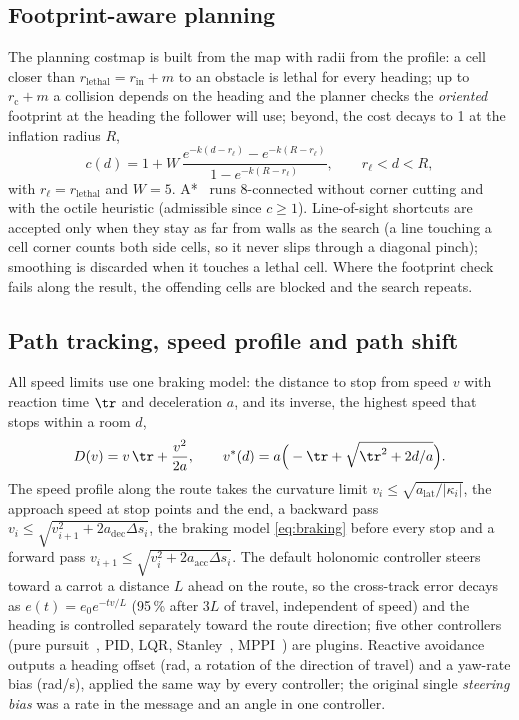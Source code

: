 \subsection{Footprint-aware planning}
\label{sec:plan}

The planning costmap is built from the map with radii from the profile: a cell closer than
$r_{\mathrm{lethal}} = r_{\mathrm{in}} + m$ to an obstacle is lethal for every heading; up to
$r_{\mathrm{c}} + m$ a collision depends on the heading and the planner checks the
\emph{oriented} footprint at the heading the follower will use; beyond, the cost decays to 1 at
the inflation radius $R$,
\begin{equation}
  c(d) = 1 + W\, \frac{e^{-k(d - r_{\ell})} - e^{-k(R - r_{\ell})}}
  {1 - e^{-k(R - r_{\ell})}}, \qquad r_{\ell} < d < R,
\end{equation}
with $r_\ell = r_{\mathrm{lethal}}$ and $W = 5$. A*~\cite{hart1968astar} runs 8-connected without corner cutting and with the
octile heuristic (admissible since $c \ge 1$). Line-of-sight shortcuts are accepted only when
they stay as far from walls as the search (a line touching a cell corner counts both side
cells, so it never slips through a diagonal pinch); smoothing is discarded when it touches a
lethal cell. Where the footprint check fails along the result, the offending cells are blocked
and the search repeats.

\subsection{Path tracking, speed profile and path shift}
\label{sec:track}

All speed limits use one braking model: the distance to stop from speed $v$ with reaction time
$\tr$ and deceleration $a$, and its inverse, the highest speed that stops within a room $d$,
\begin{equation}
  D(v) = v\,\tr + \frac{v^2}{2a}, \qquad
  v^*(d) = a\Big(-\tr + \sqrt{\tr^2 + 2d/a}\Big).
  \label{eq:braking}
\end{equation}
The speed profile along the route takes the curvature limit $v_i \le \sqrt{a_{\mathrm{lat}}
/|\kappa_i|}$, the approach speed at stop points and the end, a backward pass
$v_i \le \sqrt{v_{i+1}^2 + 2 a_{\mathrm{dec}} \Delta s_i}$, the braking model \eqref{eq:braking}
before every stop and a forward pass $v_{i+1} \le \sqrt{v_i^2 + 2 a_{\mathrm{acc}} \Delta s_i}$.
The default holonomic controller steers toward a carrot a distance $L$ ahead on the route, so
the cross-track error decays as $e(t) = e_0 e^{-t v/L}$ (95\,\% after $3L$ of travel,
independent of speed) and the heading is controlled separately toward the route direction; five
other controllers (pure pursuit~\cite{coulter1992purepursuit}, PID, LQR,
Stanley~\cite{thrun2006stanley}, MPPI~\cite{williams2017mppi}) are plugins. Reactive avoidance
outputs a heading offset (rad, a rotation of the direction of travel) and a yaw-rate bias
(rad/s), applied the same way by every controller; the original single \emph{steering bias}
was a rate in the message and an angle in one controller.

